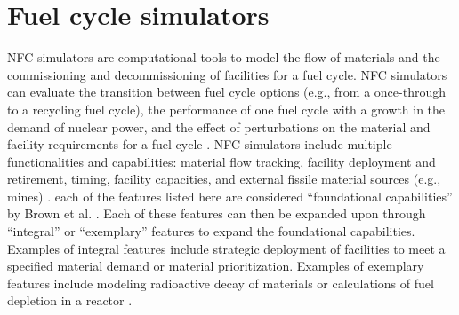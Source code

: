 \section{Fuel cycle simulators}
\gls{NFC} simulators are computational tools to model the flow of materials
and the commissioning and decommissioning of facilities for a fuel 
cycle. \gls{NFC} simulators can evaluate the transition between fuel cycle 
options (e.g., from a once-through to a recycling fuel cycle), the 
performance of one fuel cycle with a growth in the demand of nuclear power, 
and the effect of perturbations on the material and facility 
requirements for a fuel cycle \cite{piet_dynamic_2011}. 
\gls{NFC} simulators include multiple functionalities and 
capabilities: material flow tracking, facility deployment and 
retirement, timing, facility capacities, and external fissile material 
sources (e.g., mines) \cite{brown_identification_2016}.
each of the features listed here are considered ``foundational 
capabilities'' by Brown et al. 
\cite{brown_identification_2016}. Each of these features can then be 
expanded upon through ``integral'' or ``exemplary'' features to expand the 
foundational capabilities. Examples of integral
features include strategic deployment of facilities to meet a specified 
material demand or material prioritization. Examples of exemplary
features include modeling radioactive decay of materials or calculations 
of fuel depletion in a reactor \cite{brown_identification_2016}. 

